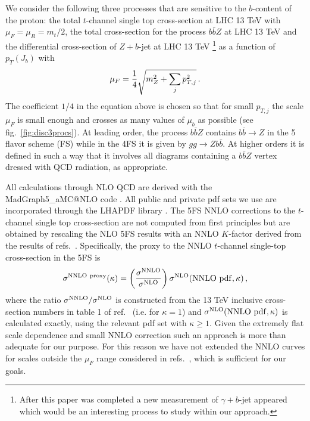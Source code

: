 \documentclass[letter,11pt]{article}
\def\b{{\bar b}}
\def\mub{\mu_b}
\def\k{\kappa}
\begin{document}
We consider the following three processes that are sensitive to the $b$-content of the proton: the total $t$-channel single top cross-section at LHC 13 TeV with $\mu_F=\mu_R=m_t/2$, the total cross-section for the process $b\bar{b}Z$ at LHC 13 TeV and the differential cross-section of $Z+b$-jet at LHC 13 TeV 
%
\footnote{After this paper was completed a new measurement \cite{Aaboud:2017skj} of $\gamma+b$-jet appeared which would be an interesting process to study within our approach.}
%
as a function of $p_T(J_b)$ with
%
\begin{equation}
\mu_F = {1\over 4}\sqrt{m_Z^2 + \sum_j p_{T,j}^2}\,.
\label{eq:muFbjet}
\end{equation}
%
The coefficient $1/4$ in the equation above is chosen so that for small $p_{T,j}$ the scale $\mu_F$ is small enough and crosses as many values of $\mub$ as possible (see fig.~\ref{fig:disc3procs}). At leading order, the process $b\bar{b}Z$ contains $b{\b}\to Z$ in the 5 flavor scheme (FS) while in the 4FS it is given by $gg\to Zb\b$. At higher orders it is defined in such a way that it involves all diagrams containing a $b\b Z$ vertex dressed with QCD radiation, as appropriate. 

All calculations through NLO QCD are derived with the {\sc\small MadGraph5\_aMC@NLO} code \cite{Alwall:2014hca}. All public and private pdf sets we use are incorporated through the LHAPDF library \cite{Buckley:2014ana}. The 5FS NNLO corrections to the $t$-channel single top cross-section are not computed from first principles but are obtained by rescaling the NLO 5FS results with an NNLO $K$-factor derived from the results of refs.~\cite{Brucherseifer:2014ama,Berger:2016oht}. Specifically, the proxy to the NNLO $t$-channel single-top cross-section in the 5FS is
%
\begin{equation}
\sigma^{\rm NNLO~proxy}(\k) = \left( \frac{\sigma^{\rm NNLO}}{\sigma^{\rm NLO}} \right) \sigma^{\rm NLO}({\rm NNLO~pdf},\k)\,,
\end{equation}
%
where the ratio $\sigma^{\rm NNLO}/\sigma^{\rm NLO}$ is constructed from the 13 TeV inclusive cross-section numbers in table 1 of ref.~\cite{Berger:2016oht} (i.e. for $\k=1$) and $\sigma^{\rm NLO}({\rm NNLO~pdf},\k)$ is calculated exactly, using the relevant pdf set with $\k\ge 1$. Given the extremely flat scale dependence and small NNLO correction such an approach is more than adequate for our purpose. For this reason we have not extended the NNLO curves for scales outside the $\mu_F$ range considered in refs.~\cite{Brucherseifer:2014ama,Berger:2016oht}, which is sufficient for our goals. 
\end{document}
